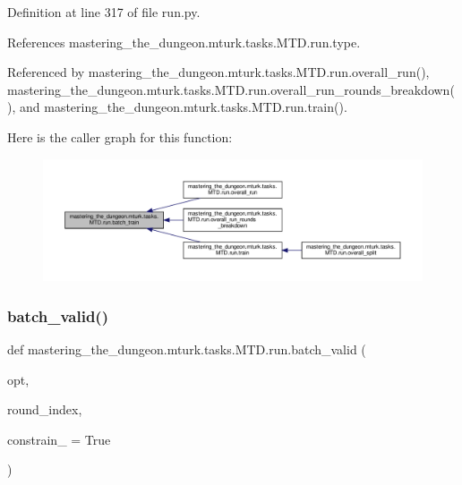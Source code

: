 Definition at line 317 of file run.\+py.



References mastering\+\_\+the\+\_\+dungeon.\+mturk.\+tasks.\+M\+T\+D.\+run.\+type.



Referenced by mastering\+\_\+the\+\_\+dungeon.\+mturk.\+tasks.\+M\+T\+D.\+run.\+overall\+\_\+run(), mastering\+\_\+the\+\_\+dungeon.\+mturk.\+tasks.\+M\+T\+D.\+run.\+overall\+\_\+run\+\_\+rounds\+\_\+breakdown(), and mastering\+\_\+the\+\_\+dungeon.\+mturk.\+tasks.\+M\+T\+D.\+run.\+train().

Here is the caller graph for this function\+:
\nopagebreak
\begin{figure}[H]
\begin{center}
\leavevmode
\includegraphics[width=350pt]{namespacemastering__the__dungeon_1_1mturk_1_1tasks_1_1MTD_1_1run_a5446e6439831de9f1fd7b8a2b86fad6b_icgraph}
\end{center}
\end{figure}
\mbox{\label{namespacemastering__the__dungeon_1_1mturk_1_1tasks_1_1MTD_1_1run_aeb512556b4b9915ef95a15f5aaac6464}} 
\subsubsection{\texorpdfstring{batch\+\_\+valid()}{batch\_valid()}}
{\footnotesize\ttfamily def mastering\+\_\+the\+\_\+dungeon.\+mturk.\+tasks.\+M\+T\+D.\+run.\+batch\+\_\+valid (\begin{DoxyParamCaption}\item[{}]{opt,  }\item[{}]{round\+\_\+index,  }\item[{}]{constrain\+\_\+ = {\ttfamily True} }\end{DoxyParamCaption})}




